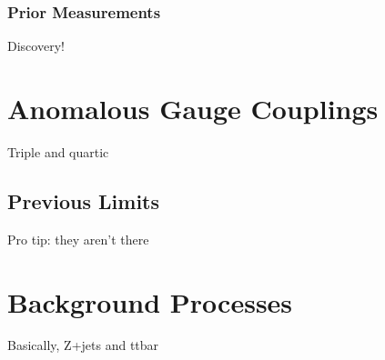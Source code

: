 \subsubsection{Prior Measurements}\label{sec:Hresults}
Discovery!



\section{Anomalous Gauge Couplings}
Triple and quartic

\subsection{Previous Limits}
Pro tip: they aren't there



\section{Background Processes}\label{sec:bkgPheno}
Basically, Z+jets and ttbar
